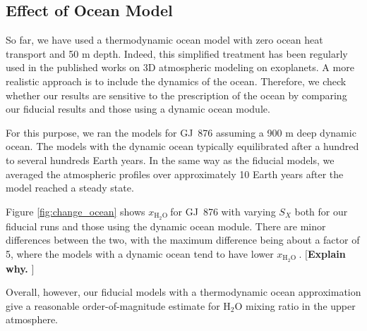 \documentclass[11pt,numberedappendix,twocolappendix,]{emulateapj}
\def\water{H$_2$O }
\def\xwater{\dsa{$x_\text{\water}$}}
\def\memo#1{\color{red}$[${\bf #1}$]$ \color{black}}
\newcommand{\dsa}[1]{{\color{blue}#1}}
\begin{document}
\subsection{Effect of Ocean Model}
\label{ss:sensitivity_ocean}


So far, we have used \dsa{a} thermodynamic ocean model with zero ocean heat transport and 50 m depth. 
Indeed, this simplified treatment has been regularly used in the published works \dsa{on 3D} atmospheric modeling \dsa{on} exoplanets. 
\dsa{A} more realistic approach is to include the dynamics of the ocean. 
Therefore, we check whether our results are sensitive to the prescription of \dsa{the} ocean by comparing our fiducial results and those using a dynamic ocean module. 

For this purpose, we ran the models for GJ~876 assuming \dsa{a} 900 m deep dynamic ocean. 
The models with the dynamic ocean typically equilibrated after a hundred to several \dsa{hundreds Earth} years. 
In the same way as the fiducial models, we averaged the \dsa{atmospheric profiles} over approximately 10 Earth years after the model reached \dsa{a} steady state. 

Figure \ref{fig:change_ocean} shows \xwater for GJ~876 with varying $S_X$ \dsa{both for our fiducial runs and those using the dynamic ocean module}.  
There \dsa{are minor differences} between the two, with the maximum difference being about \dsa{a} factor of 5, where the models with \dsa{a} dynamic ocean tend to have lower \xwater. 
\memo{Explain why. }

Overall, however, our fiducial models with \dsa{a} thermodynamic ocean approximation give a reasonable order-of-magnitude estimate for \water mixing ratio in the upper atmosphere. 
\end{document}
